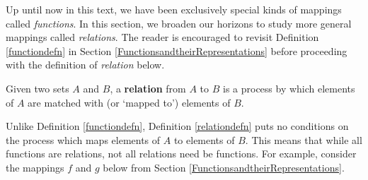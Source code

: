 \documentclass{ximera}
\begin{document}
	\author{Stitz-Zeager}




\setcounter{footnote}{0}

\label{Relations}

Up until now in this text,  we have been exclusively special kinds of mappings called  \textit{functions}.  In this section, we broaden our horizons to study more general mappings called \textit{relations}.  The reader is encouraged to revisit Definition \ref{functiondefn} in Section \ref{FunctionsandtheirRepresentations} before proceeding with the definition of \textit{relation} below.


\begin{definition}

\label{relationdefn}

Given two sets $A$ and $B$, a   \textbf{relation} from $A$ to $B$ is a process by which elements of $A$ are matched with (or `mapped to')  elements of $B$.  

\end{definition}


Unlike Definition \ref{functiondefn}, Definition \ref{relationdefn} puts no conditions on the process which maps elements of $A$ to elements of $B$. This means that while all functions are relations, not all relations need be functions.  For example, consider the mappings $f$ and $g$  below from Section \ref{FunctionsandtheirRepresentations}.  
\end{document}
